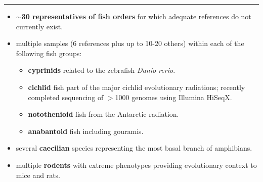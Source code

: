 \documentclass[a0,portrait]{a0poster}
\begin{document}
\vfill

\begin{center}\noindent\rule{1.0\linewidth}{0.05pt}\end{center}


\begin{multicols}{3}


\vspace{0.5cm}
\begin{tcolorbox}[boxsep=20pt,width=\linewidth,colback=sangerlightyellow,arc=20pt]
\large \color{sangertext}
\begin{flushleft}
\begin{itemize}
\setlength{\itemsep}{1.5pt}
\item \textbf{$\sim$30 representatives of fish orders} for which adequate references do not currently exist.
\item multiple samples (6 references plus up to 10-20 others) within each of the following fish groups:
\begin{itemize}
	\item {\color{cyprinid}\textbf{cyprinids}} related to the zebrafish \emph{Danio rerio}.
	\item {\color{cichlid}\textbf{cichlid}} fish part of the major cichlid evolutionary radiations; recently completed sequencing of $>$1000 genomes using Illumina HiSeqX.
	\item {\color{notothenioid}\textbf{notothenioid}} fish from the Antarctic radiation.
	\item {\color{anabantoid}\textbf{anabantoid}} fish including gouramis.
\end{itemize}
\item several {\color{caecilian}\textbf{caecilian}} species representing the most basal branch of amphibians.
\item multiple {\color{rodent}\textbf{rodents}} with extreme phenotypes providing evolutionary context to mice and rats.
\end{itemize}
\end{flushleft}
\end{tcolorbox}
\vspace{0.5cm}

\vfill
\columnbreak


\end{multicols}
\end{document}
